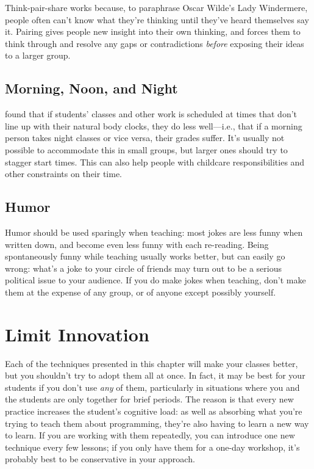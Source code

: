 Think-pair-share works because, to paraphrase Oscar Wilde's Lady
Windermere, people often can't know what they're thinking until they've
heard themselves say it. Pairing gives people new insight into their own
thinking, and forces them to think through and resolve any gaps or
contradictions \emph{before} exposing their ideas to a larger group.

\subsection*{Morning, Noon, and Night}

\cite{Smar2018} found that if students' classes and other work is
scheduled at times that don't line up with their natural body clocks,
they do less well---i.e., that if a morning person takes night classes or
vice versa, their grades suffer. It's usually not possible to
accommodate this in small groups, but larger ones should try to stagger
start times. This can also help people with childcare responsibilities
and other constraints on their time.

\subsection*{Humor}

Humor should be used sparingly when teaching: most jokes are less funny
when written down, and become even less funny with each re-reading.
Being spontaneously funny while teaching usually works better, but can
easily go wrong: what's a joke to your circle of friends may turn out to
be a serious political issue to your audience. If you do make jokes when
teaching, don't make them at the expense of any group, or of anyone
except possibly yourself.

\section{Limit Innovation}\label{s:classroom-innovate}

Each of the techniques presented in this chapter will make your classes
better, but you shouldn't try to adopt them all at once. In fact, it may
be best for your students if you don't use \emph{any} of them, particularly
in situations where you and the students are only together for brief
periods. The reason is that every new practice increases the student's
cognitive load: as well as absorbing what you're trying to teach them
about programming, they're also having to learn a new way to learn. If
you are working with them repeatedly, you can introduce one new
technique every few lessons; if you only have them for a one-day
workshop, it's probably best to be conservative in your approach.

